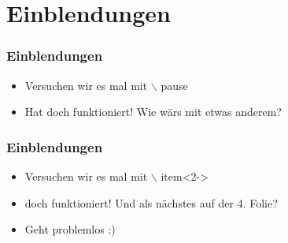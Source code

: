 \section{Einblendungen}

\begin{frame}\frametitle{Einblendungen}
    \begin{itemize}
        \item Versuchen wir es mal mit $\backslash$ pause
        \pause
        \item Hat doch funktioniert! Wie wärs mit etwas anderem?
    \end{itemize}
\end{frame}

\begin{frame}\frametitle{Einblendungen}
    \begin{itemize}
        \item<1-> Versuchen wir es mal mit $\backslash$ item<2->
        \item<2-> doch funktioniert! Und als nächstes auf der 4. Folie?
        \item<4-> Geht problemlos :)
    \end{itemize}
\end{frame}